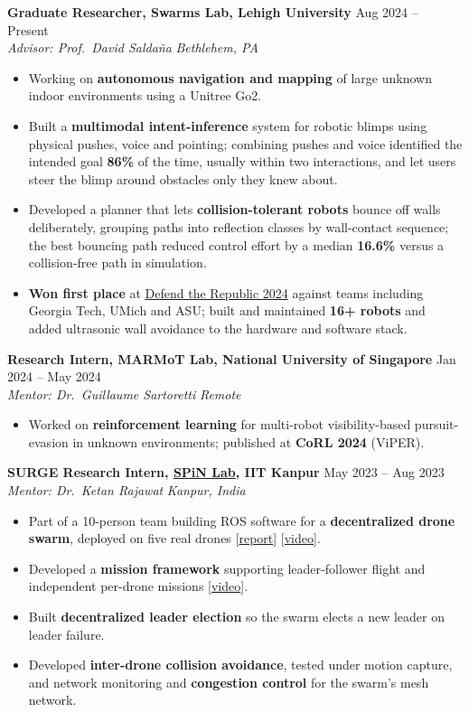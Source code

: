 \documentclass[11pt,letterpaper]{article}
\newcommand{\entry}[4]{%
  \textbf{#1} \hfill #2 \\
  \textit{#3} \hfill \textit{#4}\par\vspace{1pt}}
\begin{document}
\entry{Graduate Researcher, Swarms Lab, Lehigh University}{Aug 2024 -- Present}
      {Advisor: Prof.\ David Salda\~na}{Bethlehem, PA}
\begin{itemize}
  \item Working on \textbf{autonomous navigation and mapping} of large unknown indoor environments using a Unitree Go2.
  \item Built a \textbf{multimodal intent-inference} system for robotic blimps using physical pushes, voice and pointing;
        combining pushes and voice identified the intended goal \textbf{86\%} of the time, usually within two interactions,
        and let users steer the blimp around obstacles only they knew about.
  \item Developed a planner that lets \textbf{collision-tolerant robots} bounce off walls deliberately, grouping paths into
        reflection classes by wall-contact sequence; the best bouncing path reduced control effort by a median
        \textbf{16.6\%} versus a collision-free path in simulation.
  \item \textbf{Won first place} at \href{https://engineering.lehigh.edu/news/article/lehigh-robotics-team-soars-victory-defend-republic-drone-competition}{Defend the Republic 2024} against teams including Georgia Tech, UMich and ASU;
        built and maintained \textbf{16+ robots} and added ultrasonic wall avoidance to the hardware and software stack.
\end{itemize}

\vspace{4pt}
\entry{Research Intern, MARMoT Lab, National University of Singapore}{Jan 2024 -- May 2024}
      {Mentor: Dr.\ Guillaume Sartoretti}{Remote}
\begin{itemize}
  \item Worked on \textbf{reinforcement learning} for multi-robot visibility-based pursuit-evasion in unknown
        environments; published at \textbf{CoRL 2024} (ViPER).
\end{itemize}

\vspace{4pt}
\entry{SURGE Research Intern, \href{https://home.iitk.ac.in/~ketan/}{SPiN Lab}, IIT Kanpur}{May 2023 -- Aug 2023}
      {Mentor: Dr.\ Ketan Rajawat}{Kanpur, India}
\begin{itemize}
  \item Part of a 10-person team building ROS software for a \textbf{decentralized drone swarm}, deployed on five real drones
        [\href{https://drive.google.com/drive/folders/1TChMz4PDQW4giv97GUWhrWedk10NNIpQ}{report}]
        [\href{https://youtu.be/Jn5sE0hCgE8}{video}].
  \item Developed a \textbf{mission framework} supporting leader-follower flight and independent per-drone missions
        [\href{https://youtu.be/xq_rb1A7OfA}{video}].
  \item Built \textbf{decentralized leader election} so the swarm elects a new leader on leader failure.
  \item Developed \textbf{inter-drone collision avoidance}, tested under motion capture, and network monitoring and
        \textbf{congestion control} for the swarm's mesh network.
\end{itemize}
\end{document}

